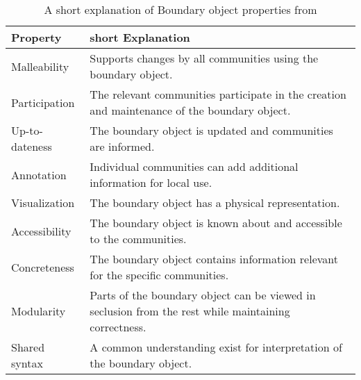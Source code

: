 \begin{table}
    \centering
    
    \begin{tabular}{|l|p{}|}
        \hline
        Property & short Explanation \\ \hline
        Malleability & Supports changes by all communities using the \gls{boundary object}.  \\ \hline
        Participation & The relevant communities participate in the creation and maintenance of the \gls{boundary object}.  \\ \hline
        Up-to-dateness & The \gls{boundary object} is updated and communities are informed. \\ \hline
        Annotation & Individual communities can add additional information for local use.  \\ \hline
        Visualization & The \gls{boundary object} has a physical representation. \\ \hline
        Accessibility & The \gls{boundary object} is known about and accessible to the communities. \\ \hline
        Concreteness & The \gls{boundary object} contains information relevant for the specific communities. \\ \hline
        Modularity & Parts of the \gls{boundary object} can be viewed in seclusion from the rest while maintaining correctness. \\ \hline
        Shared syntax & A common understanding exist for interpretation of the \gls{boundary object}.  \\ 
        \hline
    \end{tabular}
    \caption{A short explanation of Boundary object properties from \cite{abraham2015crossing}}
    \label{tab:2-boundary-properties}
\end{table}



